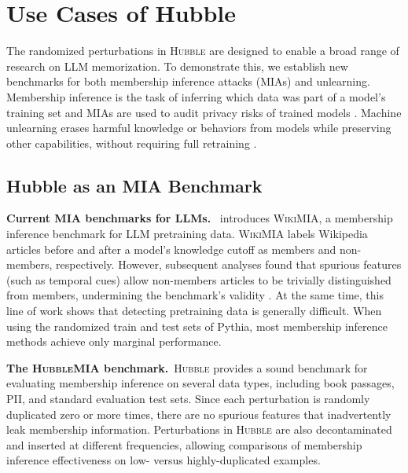 \section{Use Cases of Hubble}
\label{sec:use_cases}



The randomized perturbations in \textsc{Hubble} are designed to enable a broad range of research on LLM memorization. To demonstrate this, we establish new benchmarks for both membership inference attacks (MIAs) and unlearning. Membership inference is the task of inferring which data was part of a  model's training set and MIAs are used to audit privacy risks of trained models  \citep{shokri2017membershipinferenceattacksmachine}. Machine unlearning erases  harmful knowledge or behaviors from models while preserving other capabilities, without requiring full retraining \citep{bourtoule_2021_machine, llm_unlearning}.

\subsection{Hubble as an MIA Benchmark}
\label{sec:hubble_as_mia}

\textbf{Current MIA benchmarks for LLMs.}~ \citet{minkMIA} introduces \textsc{WikiMIA}, a membership inference benchmark for LLM pretraining data. \textsc{WikiMIA} labels Wikipedia articles before and after a model’s knowledge cutoff as members and non-members, respectively. However, subsequent analyses found that spurious features (such as temporal cues) allow non-members articles to be trivially distinguished from members, undermining the benchmark's validity \citep{duan2024membershipinferenceattackswork,meeus_sok_2025, naseh2025syntheticdatamisleadevaluations}. At the same time, this line of work shows that detecting pretraining data is generally difficult. When using the randomized train and test sets of Pythia, most membership inference methods achieve only marginal performance.

\textbf{The \textsc{HubbleMIA} benchmark.}~\textsc{Hubble} provides a sound benchmark for evaluating membership inference on several data types, including book passages, PII, and standard evaluation test sets. Since each perturbation is randomly duplicated zero or more times, there are no spurious features that inadvertently leak membership information. Perturbations in \textsc{Hubble} are also decontaminated and inserted at different frequencies, allowing comparisons of membership inference effectiveness on low- versus highly-duplicated examples. %

